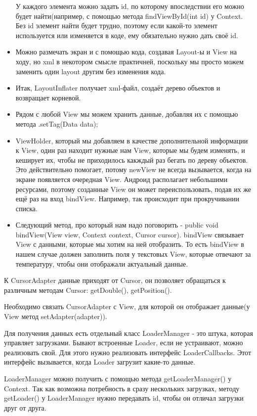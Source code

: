 \documentclass[12 pt]{article}
\begin{document}
\begin{itemize}
        У каждого элемента можно задать id, по которому впоследствии его можно будет найти(например, с помощью метода findViewById(int id) у Context. Без id элемент найти будет трудно, поэтому если какой-то элемент используется или изменяется в коде, ему обязательно нужно дать своё id.
        \item Можно размечать экран и с помощью кода, создавая Layout-ы и View на ходу, но xml в некотором смысле практичней, поскольку мы просто можем заменить один layout другим без изменения кода.
        \item Итак, LayoutInflater получает xml-файл, создаёт дерево объектов и возвращает корневой.
        \item Рядом с любой View мы можем хранить данные, добавляя их с помощью метода .setTag(Data data);
        \item ViewHolder, который мы добавляем в качестве дополнительной информации к View, один раз находит нужные нам View, которые мы будем изменять, и кеширует их, чтобы не приходилось какждый раз бегать по дереву объектов. Это действительно помогает, потому newView не всегда вызывается, когда на экране появляется очередная View. Андроид располагает небольшими ресурсами, поэтому созданные View он может переиспользовать, подав их же ещё раз на вход bindView. Например, так происходит при прокручивании списка.
        \item Следующий метод, про который нам надо поговорить - public void bindView(View view, Context context, Cursor cursor). bindView связывает View с данными, которые мы хотим на ней отобразить. То есть bindView в нашем случае должен заполнить поля у текстовых View, которые отвечают за температуру, чтобы они отображали актуальный данные.
    \end{itemize}
    
    К CursorAdapter данные приходят от Cursor, он позволяет обращаться к различным методам Cursor: getDouble(), getPosition().
	
	Необходимо связать CursorAdapter с View, для которой он отображает данные(у View метод setAdapter(adapter)).
    
    Для получения данных есть отдельный класс LoaderManager - это штука, которая управляет загрузками. Бывают встроенные Loader, если не устраивают, можно реализовать свой. Для этого нужно реализовать интерфейс LoaderCallbacks. Этот интерфейс вызывается, когда Loader загрузит какие-то данные.
	
    LoaderManager можно получить с помощью метода getLoaderManager() у Context. Так как возможна потребность в сразу нескольких загрузках, методу getLoader() у LoaderManager нужно передавать id, чтобы он отличал загрузки друг от друга.
    
\end{document}
